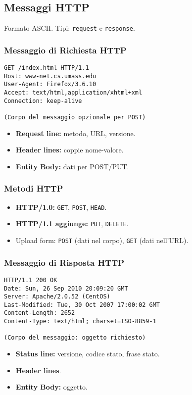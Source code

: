 \subsection{Messaggi HTTP}
Formato ASCII. Tipi: \texttt{request} e \texttt{response}.
\subsubsection{Messaggio di Richiesta HTTP}
\begin{verbatim}
GET /index.html HTTP/1.1
Host: www-net.cs.umass.edu
User-Agent: Firefox/3.6.10
Accept: text/html,application/xhtml+xml
Connection: keep-alive

(Corpo del messaggio opzionale per POST)
\end{verbatim}
\begin{itemize}
    \item \textbf{Request line:} metodo, URL, versione.
    \item \textbf{Header lines:} coppie nome-valore.
    \item \textbf{Entity Body:} dati per POST/PUT.
\end{itemize}

\subsubsection{Metodi HTTP}
\begin{itemize}
    \item \textbf{HTTP/1.0:} \texttt{GET}, \texttt{POST}, \texttt{HEAD}.
    \item \textbf{HTTP/1.1 aggiunge:} \texttt{PUT}, \texttt{DELETE}.
    \item Upload form: \texttt{POST} (dati nel corpo), \texttt{GET} (dati nell'URL).
\end{itemize}

\subsubsection{Messaggio di Risposta HTTP}
\begin{verbatim}
HTTP/1.1 200 OK
Date: Sun, 26 Sep 2010 20:09:20 GMT
Server: Apache/2.0.52 (CentOS)
Last-Modified: Tue, 30 Oct 2007 17:00:02 GMT
Content-Length: 2652
Content-Type: text/html; charset=ISO-8859-1

(Corpo del messaggio: oggetto richiesto)
\end{verbatim}
\begin{itemize}
    \item \textbf{Status line:} versione, codice stato, frase stato.
    \item \textbf{Header lines}.
    \item \textbf{Entity Body:} oggetto.
\end{itemize}

